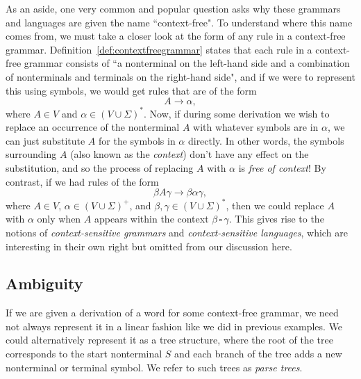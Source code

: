 As an aside, one very common and popular question asks why these grammars and languages are given the name ``context-free". To understand where this name comes from, we must take a closer look at the form of any rule in a context-free grammar. Definition~\ref{def:contextfreegrammar} states that each rule in a context-free grammar consists of ``a nonterminal on the left-hand side and a combination of nonterminals and terminals on the right-hand side", and if we were to represent this using symbols, we would get rules that are of the form
\begin{equation*}
A \rightarrow \alpha,
\end{equation*}
where $A \in V$ and $\alpha \in (V \cup \Sigma)^{*}$. Now, if during some derivation we wish to replace an occurrence of the nonterminal $A$ with whatever symbols are in $\alpha$, we can just substitute $A$ for the symbols in $\alpha$ directly. In other words, the symbols surrounding $A$ (also known as the \emph{context}) don't have any effect on the substitution, and so the process of replacing $A$ with $\alpha$ is \emph{free of context}! By contrast, if we had rules of the form
\begin{equation*}
\beta A \gamma \rightarrow \beta \alpha \gamma,
\end{equation*}
where $A \in V$, $\alpha \in (V \cup \Sigma)^{+}$, and $\beta, \gamma \in (V \cup \Sigma)^{*}$, then we could replace $A$ with $\alpha$ only when $A$ appears within the context $\beta \, \square \, \gamma$. This gives rise to the notions of \emph{context-sensitive grammars} and \emph{context-sensitive languages}, which are interesting in their own right but omitted from our discussion here.



\subsection{Ambiguity}

If we are given a derivation of a word for some context-free grammar, we need not always represent it in a linear fashion like we did in previous examples. We could alternatively represent it as a tree structure, where the root of the tree corresponds to the start nonterminal $S$ and each branch of the tree adds a new nonterminal or terminal symbol. We refer to such trees as \emph{parse trees}.

